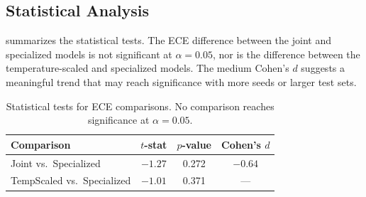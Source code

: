 \subsection{Statistical Analysis}
\label{sec:stats}

 summarizes the statistical tests. The ECE difference between the joint and specialized models is not significant at $\alpha = 0.05$, nor is the difference between the temperature-scaled and specialized models. The medium Cohen's $d$ suggests a meaningful trend that may reach significance with more seeds or larger test sets.

\begin{table}[t]
    \centering
    \caption{Statistical tests for ECE comparisons. No comparison reaches significance at $\alpha = 0.05$.}
    \begin{tabular}{@{}lccc@{}}
        \toprule
        \textbf{Comparison} & \textbf{$t$-stat} & \textbf{$p$-value} & \textbf{Cohen's $d$} \\
        \midrule
        Joint vs.\ Specialized       & $-1.27$ & 0.272 & $-0.64$ \\
        TempScaled vs.\ Specialized   & $-1.01$ & 0.371 & --- \\
        \bottomrule
    \end{tabular}
    \label{tab:stats}
\end{table}